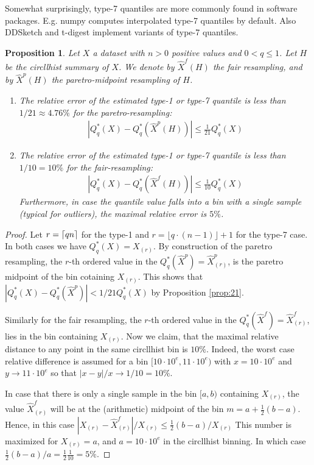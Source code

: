 \documentclass{article}
\DeclarePairedDelimiter{\ceil}{\lceil}{\rceil}
\theoremstyle{plain}
\newtheorem{proposition}[definition]{Proposition}
\theoremstyle{remark}
\newcommand{\ra}{\rightarrow}
\newcommand{\floor}[1]{\lfloor#1\rfloor}
\begin{document}
Somewhat surprisingly, type-7 quantiles are more commonly found in software packages.
E.g. numpy \cite{numpy} computes interpolated type-7 quantiles by default.
Also DDSketch \cite{dd} and t-digest \cite{tdigest} implement variants of type-7 quantiles.

\begin{proposition}
  Let $X$ a dataset with $n > 0$ positive values and $0 < q \leq 1$. Let $H$ be the circllhist summary of $X$.
  We denote by $\hat{X}^f(H)$ the fair resampling, and by $\hat{X}^p(H)$ the paretro-midpoint resampling of $H$.
  \begin{enumerate}
  \item The relative error of the estimated type-1 or type-7 quantile is less than $1/21 \approx 4.76\%$ for
    the paretro-resampling:
    \begin{align*}
      |Q^*_q(X) - Q^*_q(\hat{X}^p(H))| \leq \frac{1}{21} Q^*_q(X)
    \end{align*}
  \item The relative error of the estimated type-1 or type-7 quantile is less than $1/10 = 10\%$ for
    the fair-resampling:
    \begin{align*}
      |Q^*_q(X) - Q^*_q(\hat{X}^f(H))| \leq \frac{1}{10} Q^*_q(X)
    \end{align*}
    Furthermore, in case the quantile value falls into a bin with a single sample (typical for
    outliers), the maximal relative error is $5\%$.
  \end{enumerate}
\end{proposition}

\begin{proof}
  Let $r = \ceil{qn}$ for the type-1 and $r = \floor{q \cdot (n - 1)} + 1$ for the type-7 case.
  In both cases we have $Q^*_q(X) = X_{(r)}$.
  By construction of the paretro resampling, the $r$-th ordered value in the $Q^*_q(\hat{X}^p) = \hat{X}^p_{(r)}$,
  is the paretro midpoint of the bin cotaining $X_{(r)}$.
  This shows that $|Q^*_q(X) - Q^*_q(\hat{X}^p)| < 1/21 Q^*_q(X)$ by Proposition \ref{prop:21}.

  Similarly for the fair resampling, the $r$-th ordered value in the $Q^*_q(\hat{X}^f) = \hat{X}^f_{(r)}$,
  lies in the bin containing $X_{(r)}$.
  Now we claim, that the maximal relative distance to any point in the same circllhist bin is $10\%$.
  Indeed, the worst case relative difference is assumed for a bin $[10 \cdot 10^e, 11 \cdot 10^e)$ with
  $x = 10 \cdot 10^e$ and $y \ra 11 \cdot 10^e$ so that $|x-y|/x \ra 1/10 = 10\%$.

  In case that there is only a single sample in the bin $[a,b)$ containing $X_{(r)}$, the value
  $\hat{X}^f_{(r)}$ will be at the (arithmetic) midpoint of the bin $m = a+\frac{1}{2}(b-a)$.
  Hence, in this case $|X_{(r)} - \hat{X}^f_{(r)}| / X_{(r)} \leq \frac{1}{2} (b-a)/X_{(r)}$
  This number is maximized for $X_{(r)} = a$, and $a = 10 \cdot 10^e$ in the circllhist binning.
  In which case $\frac{1}{2} (b-a)/a =\frac{1}{2} \frac{1}{10} = 5\%$.
\end{proof}
\end{document}
